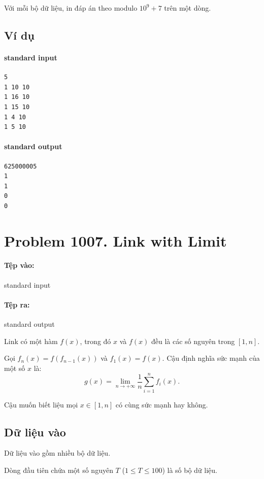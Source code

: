 \documentclass[11pt]{article}
\begin{document}
Với mỗi bộ dữ liệu, in đáp án theo modulo \(10^9+7\) trên một dòng.

\subsection*{Ví dụ}

\paragraph{standard input}
\begin{verbatim}
5
1 10 10
1 16 10
1 15 10
1 4 10
1 5 10
\end{verbatim}

\paragraph{standard output}
\begin{verbatim}
625000005
1
1
0
0
\end{verbatim}

\section{Problem 1007. Link with Limit}

\paragraph{Tệp vào:} standard input
\paragraph{Tệp ra:} standard output

Link có một hàm \(f(x)\), trong đó \(x\) và \(f(x)\) đều là các số nguyên
trong \([1,n]\).

Gọi \(f_n(x)=f(f_{n-1}(x))\) và \(f_1(x)=f(x)\). Cậu định nghĩa sức mạnh của
một số \(x\) là:
\[
  g(x)=\lim_{n\to +\infty}\frac{1}{n}\sum_{i=1}^{n} f_i(x).
\]

Cậu muốn biết liệu mọi \(x\in[1,n]\) có cùng sức mạnh hay không.

\subsection*{Dữ liệu vào}

Dữ liệu vào gồm nhiều bộ dữ liệu.

Dòng đầu tiên chứa một số nguyên \(T\) (\(1\le T\le 100\)) là số bộ dữ liệu.
\end{document}
